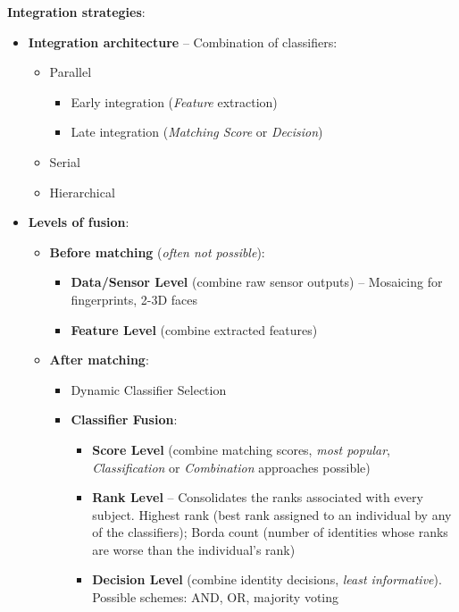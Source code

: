 \documentclass[a4paper]{article}
\begin{document}
      \textbf{Integration strategies}:
        \begin{itemize}
          \item \textbf{Integration architecture} -- Combination of classifiers:
          \begin{itemize}
            \item Parallel
            \begin{itemize}
              \item Early integration (\emph{Feature} extraction)
              \item Late integration (\emph{Matching Score} or \emph{Decision})
            \end{itemize}
            \item Serial
            \item Hierarchical
          \end{itemize}
          \item \textbf{Levels of fusion}:
          \begin{itemize}
            \item \textbf{Before matching} (\emph{often not possible}):
            \begin{itemize}
              \item \textbf{Data/Sensor Level} (combine raw sensor outputs) -- Mosaicing for fingerprints, 2-3D faces
              \item \textbf{Feature Level} (combine extracted features)
            \end{itemize}
            \item \textbf{After matching}:
            \begin{itemize}
              \item Dynamic Classifier Selection
              \item \textbf{Classifier Fusion}:
              \begin{itemize}
                \item \textbf{Score Level} (combine matching scores, \emph{most popular}, \emph{Classification} or \emph{Combination} approaches possible)
                \item \textbf{Rank Level} -- Consolidates the ranks associated with every subject. Highest rank (best rank assigned to an individual by any of the classifiers); Borda count (number of identities whose ranks are worse than the individual's rank)
                \item \textbf{Decision Level} (combine identity decisions, \emph{least informative}). Possible schemes: AND, OR, majority voting\\

\end{itemize}
\end{itemize}
\end{itemize}
\end{itemize}
\end{document}
